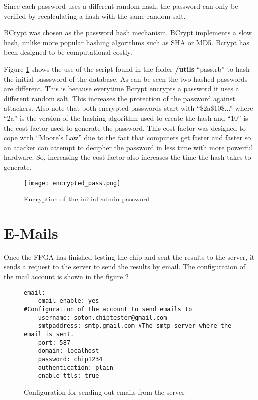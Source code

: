 Since each password uses a different random hash, the password can only be verified
by recalculating a hash with the same random salt.

BCrypt was chosen as the password hash mechanism. BCrypt implements a slow hash,
unlike more popular hashing algorithms such as SHA or MD5. Bcrypt has been designed to
be computational costly.

Figure \ref{fig:initial_pass} shows the use of the script found in the folder {\bf /utils} ``pass.rb'' to hash the initial passsword of the database. As can be seen the two hashed passwords are different. This is because everytime Bcrypt encrypts a password it uses a different random salt.
This increases the protection of the password against attackers. Also note that both encrypted passwords start with ``\$2a\$10\$...'' where ``2a'' is the version of the hashing algorithm used to create the hash and ``10'' is the cost factor used to generate the password. This cost factor
was designed to cope with ``Moore's Law'' due to the fact that computers get faster and faster so an atacker can attempt to decipher the password in less time with more powerful hardware. So, increasing the cost factor also increases the time the hash takes to generate.

\begin{figure}[htb]
\centering
\texttt{[image: encrypted\_pass.png]}
\caption{Encryption of the initial admin password}
\label{fig:initial_pass}
\end{figure}


\section{E-Mails}
Once the FPGA has finished testing the chip and sent the results to the server,
it sends a request to the server to send the results by email.
The configuration of the mail account is shown in the figure \ref{fig:email_server}

\begin{figure}[htb]
\lstset{basicstyle=\scriptsize\ttfamily}
\begin{lstlisting}
email:
    email_enable: yes
#Configuration of the account to send emails to
    username: soton.chiptester@gmail.com
    smtpaddress: smtp.gmail.com #The smtp server where the email is sent.
    port: 587
    domain: localhost
    password: chip1234
    authentication: plain
    enable_ttls: true
\end{lstlisting}
\caption{Configuration for sending out emails from the server}
\label{fig:email_server}
\end{figure}


